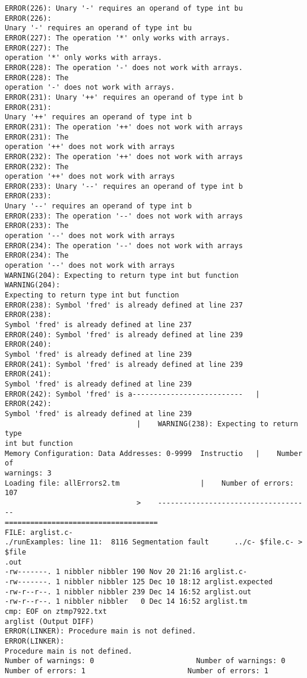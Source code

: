 \documentclass[12pt]{book}
\begin{document}
\begin{lstlisting}
ERROR(226): Unary '-' requires an operand of type int bu    ERROR(226): 
Unary '-' requires an operand of type int bu
ERROR(227): The operation '*' only works with arrays.        ERROR(227): The
operation '*' only works with arrays.
ERROR(228): The operation '-' does not work with arrays.    ERROR(228): The 
operation '-' does not work with arrays.
ERROR(231): Unary '++' requires an operand of type int b    ERROR(231): 
Unary '++' requires an operand of type int b
ERROR(231): The operation '++' does not work with arrays    ERROR(231): The 
operation '++' does not work with arrays
ERROR(232): The operation '++' does not work with arrays    ERROR(232): The 
operation '++' does not work with arrays
ERROR(233): Unary '--' requires an operand of type int b    ERROR(233): 
Unary '--' requires an operand of type int b
ERROR(233): The operation '--' does not work with arrays    ERROR(233): The 
operation '--' does not work with arrays
ERROR(234): The operation '--' does not work with arrays    ERROR(234): The 
operation '--' does not work with arrays
WARNING(204): Expecting to return type int but function     WARNING(204): 
Expecting to return type int but function 
ERROR(238): Symbol 'fred' is already defined at line 237    ERROR(238): 
Symbol 'fred' is already defined at line 237
ERROR(240): Symbol 'fred' is already defined at line 239    ERROR(240): 
Symbol 'fred' is already defined at line 239
ERROR(241): Symbol 'fred' is already defined at line 239    ERROR(241): 
Symbol 'fred' is already defined at line 239
ERROR(242): Symbol 'fred' is a--------------------------   |    ERROR(242): 
Symbol 'fred' is already defined at line 239
                               |    WARNING(238): Expecting to return type 
int but function 
Memory Configuration: Data Addresses: 0-9999  Instructio   |    Number of 
warnings: 3
Loading file: allErrors2.tm                   |    Number of errors: 107
                               >    ------------------------------------
====================================
FILE: arglist.c-
./runExamples: line 11:  8116 Segmentation fault      ../c- $file.c- > $file
.out
-rw-------. 1 nibbler nibbler 190 Nov 20 21:16 arglist.c-
-rw-------. 1 nibbler nibbler 125 Dec 10 18:12 arglist.expected
-rw-r--r--. 1 nibbler nibbler 239 Dec 14 16:52 arglist.out
-rw-r--r--. 1 nibbler nibbler   0 Dec 14 16:52 arglist.tm
cmp: EOF on ztmp7922.txt
arglist (Output DIFF)
ERROR(LINKER): Procedure main is not defined.            ERROR(LINKER): 
Procedure main is not defined.
Number of warnings: 0                        Number of warnings: 0
Number of errors: 1                        Number of errors: 1

\end{lstlisting}
\end{document}
